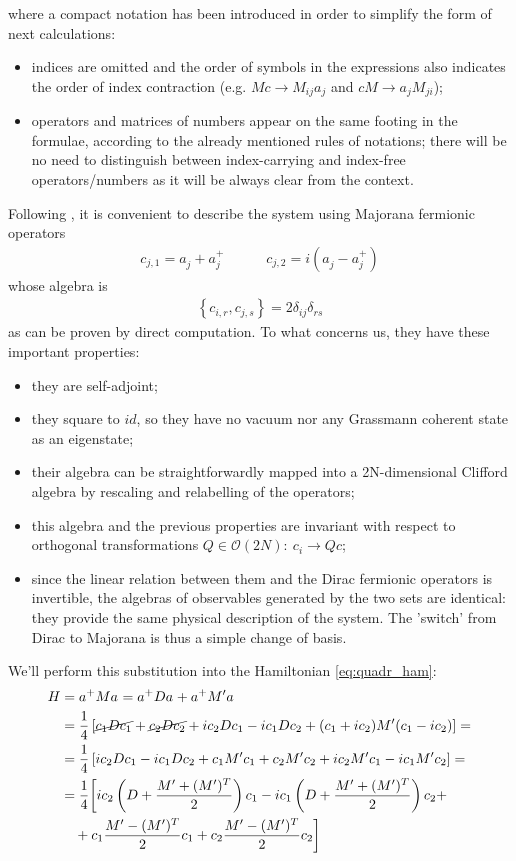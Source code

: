 \documentclass[a4paper,11pt]{article}
\newcommand{\np}{\vskip 1.3cm}
\begin{document}
 where a compact notation has been introduced in order to simplify the form of next calculations: 
 \begin{itemize}
  \item indices are omitted and the order of symbols in the expressions also indicates the order of index contraction (e.g. $Mc\rightarrow M_{ij}a_j$ and $cM \rightarrow a_j M_{ji}$);
  \item operators and matrices of numbers appear on the same footing in the formulae, according to the already mentioned rules of notations; there will be no need to distinguish between index-carrying and index-free operators/numbers as it will be always clear from the context.
 \end{itemize}
  \np
 Following \cite{Eisert2010}, it is convenient to describe the system using Majorana fermionic operators
 \begin{align}
  c_{j, 1} = a_j^{ }+a_j^{+} \quad \quad \quad
  c_{j, 2} = i(a_j^{ }-a_j^{+})
  \label{eq:def_majorana}
 \end{align}
  whose algebra is 
 \begin{align}
  \left\{c_{i,r},c_{j,s}\right\} = 2\delta_{ij}\delta_{rs}
  \label{eq:algebra_majorana}
 \end{align}
  as can be proven by direct computation. To what concerns us, they have these important properties:
  \begin{itemize}
   \item they are self-adjoint;
   \item they square to $id$, so they have no vacuum nor any Grassmann coherent state as an eigenstate;
   \item their algebra can be straightforwardly mapped into a 2N-dimensional Clifford algebra by rescaling and relabelling of the operators; 
   \item this algebra and the previous properties are invariant with respect to orthogonal transformations $Q\in\mathcal{O}(2N):\ c_i\rightarrow Qc$;
   \item since the linear relation between them and the Dirac fermionic operators is invertible, the algebras of observables generated by the two sets are identical: they provide the same physical description of the system. The 'switch' from Dirac to Majorana is thus a simple change of basis.
  \end{itemize}
  We'll perform this substitution into the Hamiltonian \ref{eq:quadr_ham}:
    \begin{align*}
     H &= a^+Ma^{ } = a^+Da^{ } + a^+M'a^{ }\notag\\
       &=\frac{1}{4}\left[\cancel{c_1Dc_1} + \cancel{c_2Dc_2} +ic_2Dc_1-ic_1Dc_2+(c_1+ic_2)M'(c_1-ic_2)\right] =  \notag\\
       &=\frac{1}{4}\left[ic_2Dc_1-ic_1Dc_2+c_1M'c_1 + c_2M'c_2 +ic_2M'c_1-ic_1M'c_2\right]=\notag \\
       &=\frac{1}{4}\bigg[ic_2\left(D+\frac{M'+(M')^T}{2}\right)c_1-ic_1\left(D+\frac{M'+(M')^T}{2}\right)c_2 +\notag\\
       &\ \ \ +c_1\frac{M'-(M')^T}{2}c_1+c_2\frac{M'-(M')^T}{2}c_2\bigg]\notag
   \end{align*}
\end{document}
